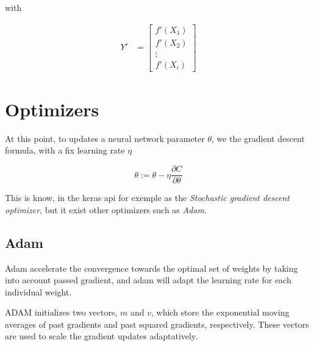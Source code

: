 \documentclass[a4paper, twocolumn, twoside]{article}
\begin{document}
	with 

	\begin{align*}
		Y\prime &= \begin{bmatrix}
		f\prime(X_1) \\
		f\prime(X_2) \\
        \vdots \\
		f\prime(X_i)
	\end{bmatrix}
	\end{align*}

	\section{Optimizers}
	
	At this point, to updates a neural network parameter $\theta$, we the gradient descent formula,
	with a fix learning rate $\eta$

	$$
	\theta := \theta - \eta \frac{\partial C}{\partial \theta}
	$$

	This is know, in the keras api for exemple as the \textit{Stochastic gradient descent optimizer},
	but it exist other optimizers such as \textit{Adam}.

	\subsection{Adam}
	Adam accelerate the convergence towards the optimal set of weights by taking into account passed gradient,
	and adam will adapt the learning rate for each individual weight.

	ADAM initializes two vectors, 
	$m$ and $v$, which store the exponential moving averages of past gradients and past squared gradients,
	respectively. These vectors are used to scale the gradient updates adaptatively.
\end{document}
